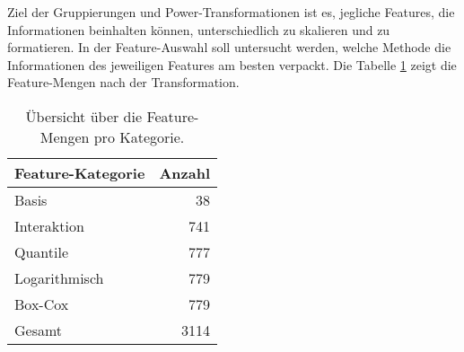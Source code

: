 Ziel der Gruppierungen und Power-Transformationen ist es, jegliche Features, die Informationen beinhalten können, unterschiedlich zu skalieren und zu formatieren. In der Feature-Auswahl soll untersucht werden, welche Methode die Informationen des jeweiligen Features am besten verpackt. Die Tabelle \ref{tab:FeatureMenge} zeigt die Feature-Mengen nach der Transformation.


\begin{table}[ht]
    \centering
    \caption{Übersicht über die Feature-Mengen pro Kategorie.}
    \begin{tabular}{|l|r|}
        \hline
        Feature-Kategorie & Anzahl\\
        \hline
        Basis & 38 \\
        Interaktion & 741\\
        Quantile & 777\\
        Logarithmisch & 779\\
        Box-Cox & 779\\
        \hline
        \hline
        Gesamt & 3114\\
        \hline
    \end{tabular}
    \label{tab:FeatureMenge}
\end{table}